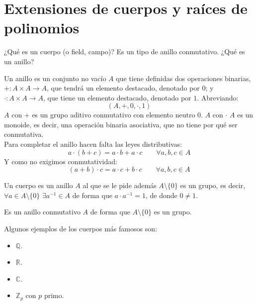 \chapter{Extensiones de cuerpos y raíces de polinomios}




¿Qué es un cuerpo (o field, campo)? Es un tipo de anillo conmutativo.\noindent
¿Qué es un anillo?

\begin{definicion}[Anillo]
    Un anillo es un conjunto no vacío $A$ que tiene definidas dos operaciones binarias, $+:A\times A\to A$, que tendrá un elemento destacado, denotado por $0$; y $\cdot:A\times A\to A$, que tiene un elemento destacado, denotado por $1$. Abreviando:
    \begin{equation*}
        (A,+,0,\cdot,1)
    \end{equation*}
    $A$ con $+$ es un grupo aditivo conmutativo con elemento neutro $0$. $A$ con $\cdot $ $A$ es un monoide, es decir, una operación binaria asociativa, que no tiene por qué ser conmutativa.\\

    \noindent
    Para completar el anillo hacen falta las leyes distributivas:
    \begin{equation*}
        a\cdot (b+c) = a\cdot b + a\cdot c \qquad \forall a,b,c\in A
    \end{equation*}
    Y como no exigimos conmutatividad:
    \begin{equation*}
        (a+b)\cdot c = a\cdot c + b\cdot c \qquad \forall a,b,c\in A
    \end{equation*}
\end{definicion}

\begin{definicion}[Cuerpo]
    Un cuerpo es un anillo $A$ al que se le pide además 
    $A\setminus \{0\}$ es un grupo, es decir, $\forall a\in A\setminus \{0\}$ $\exists a^{-1}\in A$ de forma que $a\cdot a^{-1} = 1$, de donde $0\neq 1$.
\end{definicion}

\begin{definicion}[Cuerpo]
    Es un anillo conmutativo $A$ de forma que $A\setminus\{0\}$ es un grupo.
\end{definicion}

\begin{ejemplo}
    Algunos ejemplos de los cuerpos más famosos son:
    \begin{itemize}
        \item $\mathbb{Q}$.
        \item $\mathbb{R}$.
        \item $\mathbb{C}$.
        \item $\mathbb{Z}_p$ con $p$ primo.
    \end{itemize}
\end{ejemplo}

